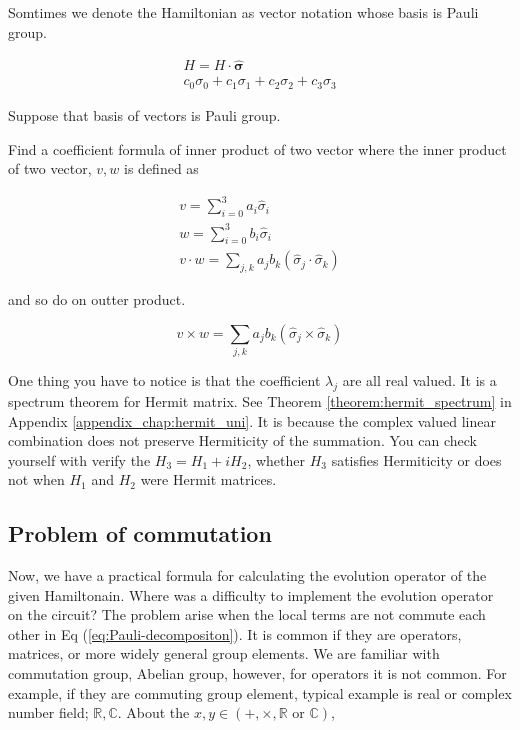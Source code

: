 Somtimes we denote the Hamiltonian as vector notation whose basis is Pauli group.

\begin{equation}
    \begin{split}
        H = H \cdot \hat{\mathbf{\sigma}} \\
        c_0 \sigma_0 +c_1 \sigma_1+c_2 \sigma_2+c_3 \sigma_3
    \end{split}
\end{equation}

\begin{exercise}
    Suppose that basis of vectors is Pauli group.

    Find a coefficient formula of inner product of two vector
    where the inner product of two vector, $v, w$ 
    is defined as
    
    \begin{equation*}
        \begin{split}
            v = \sum_{i=0}^3 a_i \hat{\sigma}_i \\
            w = \sum_{i=0}^3 b_i \hat{\sigma}_i \\
            v \cdot w = \sum_{j, k} a_j b_k (\hat{\sigma}_j \cdot \hat{\sigma}_k)
        \end{split}
    \end{equation*}

    and so do on outter product.

    \begin{equation*}
        v \times w = \sum_{j, k} a_j b_k (\hat{\sigma}_j \times \hat{\sigma}_k)
    \end{equation*}
\end{exercise}

One thing you have to notice is that the coefficient $\lambda_j$ are all real valued.
It is a spectrum theorem for Hermit matrix. See Theorem \ref{theorem:hermit_spectrum} in Appendix \ref{appendix_chap:hermit_uni}.
It is because the complex valued linear combination does not preserve Hermiticity of the 
summation. You can check yourself with verify the $H_3 = H_1 + i H_2$, whether $H_3$ satisfies Hermiticity or does not
when $H_1$ and $H_2$ were Hermit matrices.

\subsection{Problem of commutation}

Now, we have a practical formula for calculating 
the evolution operator of the given Hamiltonain.
Where was a difficulty to implement the evolution operator on the circuit?
The problem arise when the local terms are not commute each other in Eq (\ref{eq:Pauli-decompositon}).
It is common if they are operators, matrices, or more widely general group elements.
We are familiar with commutation group, Abelian group, however, for operators it is not common.
For example, if they are commuting group element, typical example is real or complex number field; $\mathbb{R, C}$. 
About the $x, y \in (+, \times, \mathbb{R} \mbox{ or } \mathbb{C})$, 

